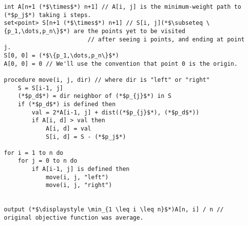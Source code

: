 \documentclass{article}
\begin{document}
\begin{lstlisting}
int A[n+1 (*$\times$*) n+1] // A[i, j] is the minimum-weight path to (*$p_j$*) taking i steps.
set<point> S[n+1 (*$\times$*) n+1] // S[i, j](*$\subseteq \{p_1,\dots,p_n\}$*) are the points yet to be visited
                        // after seeing i points, and ending at point j.
S[0, 0] = (*$\{p_1,\dots,p_n\}$*)
A[0, 0] = 0 // We'll use the convention that point 0 is the origin.

procedure move(i, j, dir) // where dir is "left" or "right"
    S = S[i-1, j]
    (*$p_d$*) = dir neighbor of (*$p_{j}$*) in S
    if (*$p_d$*) is defined then
        val = 2*A[i-1, j] + dist((*$p_{j}$*), (*$p_d$*))
        if A[i, d] > val then
            A[i, d] = val
            S[i, d] = S - (*$p_j$*)

for i = 1 to n do
    for j = 0 to n do
        if A[i-1, j] is defined then
            move(i, j, "left")
            move(i, j, "right")
            

output (*$\displaystyle \min_{1 \leq i \leq n}$*)A[n, i] / n // original objective function was average.
\end{lstlisting}
\end{document}
